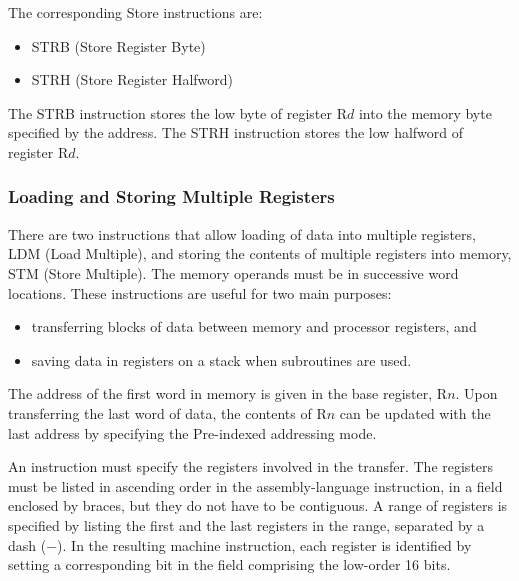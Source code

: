 \documentclass[11pt, twoside, pdftex]{article}
\begin{document}
The corresponding Store instructions are: 
\begin{itemize}
\item STRB (Store Register Byte)
\item STRH (Store Register Halfword)
\end{itemize}
\noindent
The STRB instruction stores the low byte of register R$d$ into
the memory byte specified by the address. The STRH instruction
stores the low halfword of register R$d$. 

\subsubsection{Loading and Storing Multiple Registers}
There are two instructions that allow loading of data into
multiple registers, LDM (Load Multiple), and storing the contents
of multiple registers into memory, STM (Store Multiple).
The memory operands must be in successive word locations.
These instructions are useful for two main purposes:
\begin{itemize}
\item transferring blocks of data between memory and processor
registers, and
\item saving data in registers on a stack when subroutines
are used.
\end{itemize}
\noindent
The address of the first word in memory is given in the base
register, R$n$. Upon transferring the last word of data, the
contents of R$n$ can be updated with the last address by
specifying the Pre-indexed addressing mode.

An instruction must specify the registers involved in the
transfer. The registers must be listed in
ascending order in the assembly-language instruction,
in a field enclosed by braces, but they
do not have to be contiguous. A range of registers is specified
by listing the first and the last registers in the range,
separated by a dash ($-$). In the resulting machine instruction,
each register is identified by setting a corresponding bit in
the field comprising the low-order 16 bits.
\end{document}
